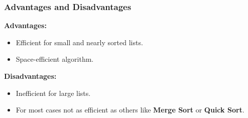 \subsubsection*{Advantages and Disadvantages}

\textbf{Advantages:}

\begin{itemize}
  \item Efficient for small and nearly sorted lists.
  \item Space-efficient algorithm.
\end{itemize}

\textbf{Disadvantages:}

\begin{itemize}
  \item Inefficient for large lists.
  \item For most cases not as efficient as others like \textbf{Merge Sort} or \textbf{Quick Sort}.
\end{itemize}
